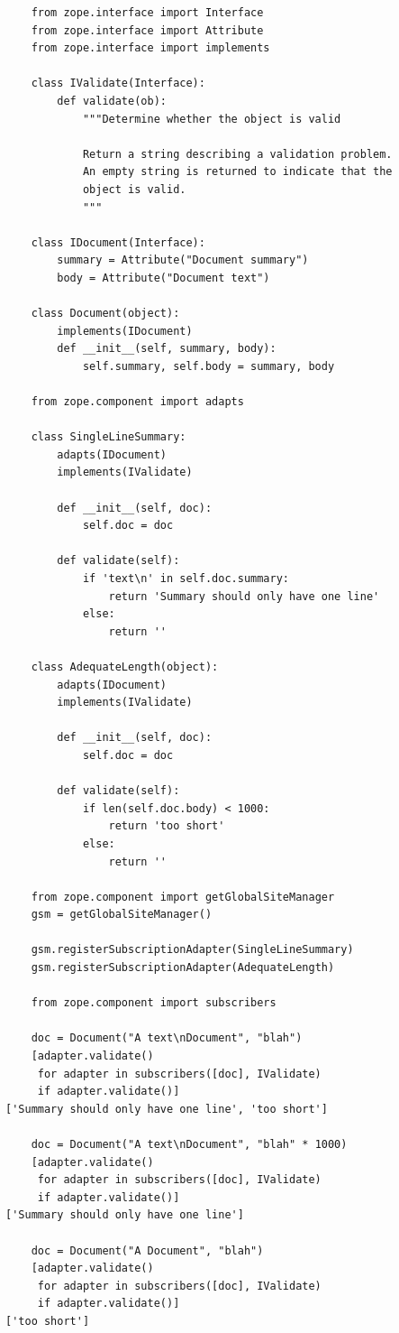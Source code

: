 \documentclass[a4paper,openany,twoside,final]{book}
\begin{document}
\begin{verbatim}
    from zope.interface import Interface
    from zope.interface import Attribute
    from zope.interface import implements

    class IValidate(Interface):
        def validate(ob):
            """Determine whether the object is valid

            Return a string describing a validation problem.
            An empty string is returned to indicate that the
            object is valid.
            """

    class IDocument(Interface):
        summary = Attribute("Document summary")
        body = Attribute("Document text")

    class Document(object):
        implements(IDocument)
        def __init__(self, summary, body):
            self.summary, self.body = summary, body

    from zope.component import adapts

    class SingleLineSummary:
        adapts(IDocument)
        implements(IValidate)

        def __init__(self, doc):
            self.doc = doc

        def validate(self):
            if 'text\n' in self.doc.summary:
                return 'Summary should only have one line'
            else:
                return ''

    class AdequateLength(object):
        adapts(IDocument)
        implements(IValidate)

        def __init__(self, doc):
            self.doc = doc

        def validate(self):
            if len(self.doc.body) < 1000:
                return 'too short'
            else:
                return ''

    from zope.component import getGlobalSiteManager
    gsm = getGlobalSiteManager()

    gsm.registerSubscriptionAdapter(SingleLineSummary)
    gsm.registerSubscriptionAdapter(AdequateLength)

    from zope.component import subscribers

    doc = Document("A text\nDocument", "blah")
    [adapter.validate()
     for adapter in subscribers([doc], IValidate)
     if adapter.validate()]
['Summary should only have one line', 'too short']

    doc = Document("A text\nDocument", "blah" * 1000)
    [adapter.validate()
     for adapter in subscribers([doc], IValidate)
     if adapter.validate()]
['Summary should only have one line']

    doc = Document("A Document", "blah")
    [adapter.validate()
     for adapter in subscribers([doc], IValidate)
     if adapter.validate()]
['too short']
\end{verbatim}
\end{document}
